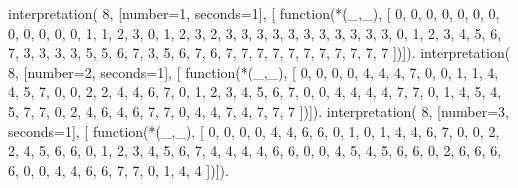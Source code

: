 interpretation( 8, [number=1, seconds=1], [
  function(*(_,_), [
     0, 0, 0, 0, 0, 0, 0, 0,
     0, 0, 0, 0, 1, 1, 2, 3,
     0, 1, 2, 3, 2, 3, 3, 3,
     3, 3, 3, 3, 3, 3, 3, 3,
     0, 1, 2, 3, 4, 5, 6, 7,
     3, 3, 3, 3, 5, 5, 6, 7,
     3, 5, 6, 7, 6, 7, 7, 7,
     7, 7, 7, 7, 7, 7, 7, 7 ])]).
interpretation( 8, [number=2, seconds=1], [
  function(*(_,_), [
     0, 0, 0, 0, 4, 4, 4, 7,
     0, 0, 1, 1, 4, 4, 5, 7,
     0, 0, 2, 2, 4, 4, 6, 7,
     0, 1, 2, 3, 4, 5, 6, 7,
     0, 0, 4, 4, 4, 4, 7, 7,
     0, 1, 4, 5, 4, 5, 7, 7,
     0, 2, 4, 6, 4, 6, 7, 7,
     0, 4, 4, 7, 4, 7, 7, 7 ])]).
interpretation( 8, [number=3, seconds=1], [
  function(*(_,_), [
     0, 0, 0, 0, 4, 4, 6, 6,
     0, 1, 0, 1, 4, 4, 6, 7,
     0, 0, 2, 2, 4, 5, 6, 6,
     0, 1, 2, 3, 4, 5, 6, 7,
     4, 4, 4, 4, 6, 6, 0, 0,
     4, 5, 4, 5, 6, 6, 0, 2,
     6, 6, 6, 6, 0, 0, 4, 4,
     6, 6, 7, 7, 0, 1, 4, 4 ])]).
